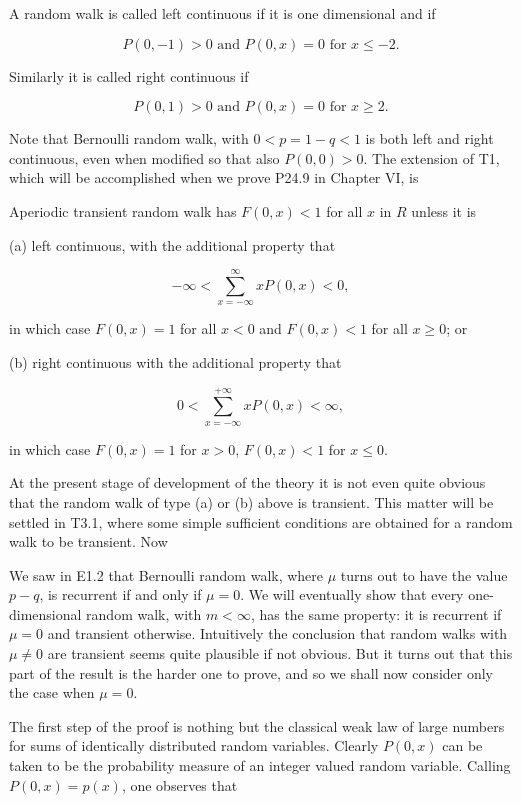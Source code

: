A random walk is called left continuous if it is one dimensional and if

$$P(0,-1) > 0 \text{ and } P(0,x) = 0 \text{ for } x \leq -2.$$

Similarly it is called right continuous if

$$P(0,1) > 0 \text{ and } P(0,x) = 0 \text{ for } x \geq 2.$$

Note that Bernoulli random walk, with $0 < p = 1 - q < 1$ is both left and right continuous, even when modified so that also $P(0,0) > 0$. The extension of T1, which will be accomplished when we prove P24.9 in Chapter VI, is

Aperiodic transient random walk has $F(0,x) < 1$ for all $x$ in $R$ unless it is

(a) left continuous, with the additional property that

$$-\infty < \sum_{x=-\infty}^{\infty} xP(0,x) < 0,$$

in which case $F(0,x) = 1$ for all $x < 0$ and $F(0,x) < 1$ for all $x \geq 0$; or

(b) right continuous with the additional property that

$$0 < \sum_{x=-\infty}^{+\infty} xP(0,x) < \infty,$$

in which case $F(0,x) = 1$ for $x > 0$, $F(0,x) < 1$ for $x \leq 0$.

At the present stage of development of the theory it is not even quite obvious that the random walk of type (a) or (b) above is transient. This matter will be settled in T3.1, where some simple sufficient conditions are obtained for a random walk to be transient. Now

We saw in E1.2 that Bernoulli random walk, where $\mu$ turns out to have the value $p - q$, is recurrent if and only if $\mu = 0$. We will eventually show that every one-dimensional random walk, with $m < \infty$, has the same property: it is recurrent if $\mu = 0$ and transient otherwise. Intuitively the conclusion that random walks with $\mu \neq 0$ are transient seems quite plausible if not obvious. But it turns out that this part of the result is the harder one to prove, and so we shall now consider only the case when $\mu = 0$.

The first step of the proof is nothing but the classical weak law of large numbers for sums of identically distributed random variables. Clearly $P(0,x)$ can be taken to be the probability measure of an integer valued random variable. Calling $P(0,x) = p(x)$, one observes that

